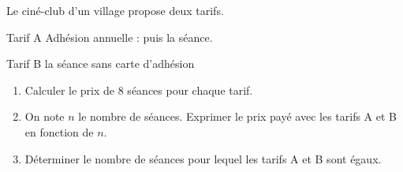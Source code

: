 \begin{exercice*}
    Le ciné-club d'un village propose deux tarifs.
    \begin{center}
        \begin{minipage}{0.6\linewidth}
            \begin{myBox}{Tarif A}
                Adhésion annuelle :  puis  la séance.
            \end{myBox}
        \end{minipage}
        
        \begin{minipage}{0.6\linewidth}
            \begin{myBox}{Tarif B}
                 la séance sans carte d'adhésion
            \end{myBox}    
        \end{minipage}
    \end{center}

    \begin{enumerate}
        \item Calculer le prix de \num{8} séances pour chaque tarif.
        \item On note $n$ le nombre de séances. Exprimer le prix payé avec les tarifs A et B en fonction de $n$.
        \item Déterminer le nombre de séances pour lequel les tarifs A et B sont égaux.
    \end{enumerate}
\end{exercice*}
